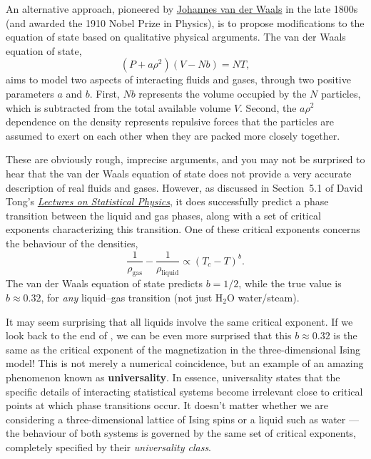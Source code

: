 An alternative approach, pioneered by \href{https://en.wikipedia.org/wiki/Johannes_Diderik_van_der_Waals}{Johannes van der Waals} in the late 1800s (and awarded the 1910 Nobel Prize in Physics), is to propose modifications to the equation of state based on qualitative physical arguments.
The van der Waals equation of state,
\begin{equation*}
  \left(P + a\rho^2\right)\left(V - Nb\right) = NT,
\end{equation*}
aims to model two aspects of interacting fluids and gases, through two positive parameters $a$ and $b$.
First, $Nb$ represents the volume occupied by the $N$ particles, which is subtracted from the total available volume $V$.
Second, the $a\rho^2$ dependence on the density represents repulsive forces that the particles are assumed to exert on each other when they are packed more closely together.

These are obviously rough, imprecise arguments, and you may not be surprised to hear that the van der Waals equation of state does not provide a very accurate description of real fluids and gases.
However, as discussed in Section~5.1 of David Tong's \href{https://www.damtp.cam.ac.uk/user/tong/statphys.html}{\textit{Lectures on Statistical Physics}}, it does successfully predict a phase transition between the liquid and gas phases, along with a set of critical exponents characterizing this transition.
One of these critical exponents concerns the behaviour of the densities,
\begin{equation*}
  \frac{1}{\rho_{\text{gas}}} - \frac{1}{\rho_{\text{liquid}}} \propto \left(T_c - T\right)^b.
\end{equation*}
The van der Waals equation of state predicts $b = 1 / 2$, while the true value is $b \approx 0.32$, for \textit{any} liquid--gas transition (not just H$_2$O water/steam).

It may seem surprising that all liquids involve the same critical exponent.
If we look back to the end of , we can be even more surprised that this $b \approx 0.32$ is the same as the critical exponent of the magnetization in the three-dimensional Ising model!
This is not merely a numerical coincidence, but an example of an amazing phenomenon known as \textbf{universality}.
In essence, universality states that the specific details of interacting statistical systems become irrelevant close to critical points at which phase transitions occur.
It doesn't matter whether we are considering a three-dimensional lattice of Ising spins or a liquid such as water --- the behaviour of both systems is governed by the same set of critical exponents, completely specified by their \textit{universality class}.

